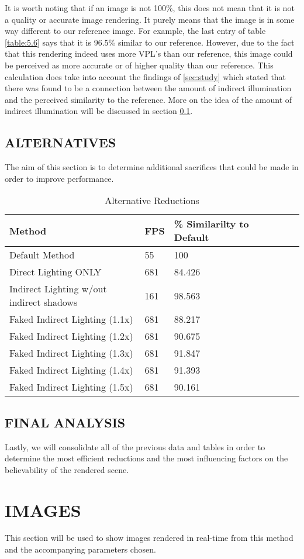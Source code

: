 It is worth noting that if an image is not 100\%, this does not mean that it is not a quality or accurate image rendering.  It purely means that the image is in some way different to our reference image.  For example, the last entry of table \ref{table:5.6} says that it is 96.5\% similar to our reference.  However, due to the fact that this rendering indeed uses more VPL's than our reference, this image could be perceived as more accurate or of higher quality than our reference.  This calculation does take into account the findings of \ref{sec:study} which stated that there was found to be a connection between the amount of indirect illumination and the perceived similarity to the reference.  More on the idea of the amount of indirect illumination will be discussed in section \ref{sec:alternatives}.

\subsection{ALTERNATIVES} \label{sec:alternatives}
The aim of this section is to determine additional sacrifices that could be made in order to improve performance.

\begin{table}[h!]
	\caption{Alternative Reductions}
	\begin{center}
	    \begin{tabular}{ | l | l | l | l | l | l |}
	    \hline
	    Method & FPS & \% Similarilty to Default\\ \hline
	    Default Method & 55 & 100\\ \hline
	    Direct Lighting ONLY & 681 & 84.426\\ \hline
	    Indirect Lighting w/out indirect shadows & 161 & 98.563\\ \hline
	    Faked Indirect Lighting (1.1x) & 681 & 88.217\\ \hline
	    Faked Indirect Lighting (1.2x) & 681 & 90.675\\ \hline
	    Faked Indirect Lighting (1.3x) & 681 & 91.847\\ \hline
	    Faked Indirect Lighting (1.4x) & 681 & 91.393\\ \hline
	    Faked Indirect Lighting (1.5x) & 681 & 90.161\\ \hline
	    \end{tabular}
	\end{center}
	\label{table:5.9}
\end{table}

\subsection{FINAL ANALYSIS}
Lastly, we will consolidate all of the previous data and tables in order to determine the most efficient reductions and the most influencing factors on the believability of the rendered scene.







\section{IMAGES}
This section will be used to show images rendered in real-time from this method and the accompanying parameters chosen.  

